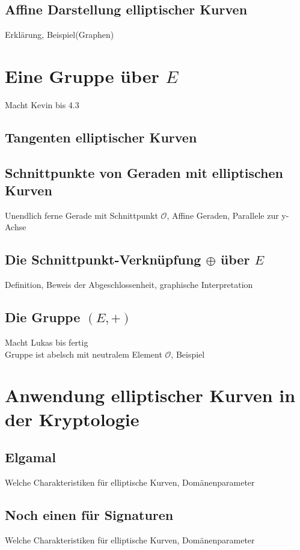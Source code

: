 \documentclass[hidelinks]{article}
\begin{document}
\subsection{Affine Darstellung elliptischer Kurven}
Erklärung, Beispiel(Graphen)
\section{Eine Gruppe über $E$}
Macht Kevin bis 4.3\\
\subsection{Tangenten elliptischer Kurven}
\subsection{Schnittpunkte von Geraden mit elliptischen Kurven}
Unendlich ferne Gerade mit Schnittpunkt $\mathcal{O}$, Affine Geraden, Parallele zur y-Achse
\subsection{Die Schnittpunkt-Verknüpfung $\oplus $ über $E$}
Definition, Beweis der Abgeschlossenheit, graphische Interpretation
\subsection{Die Gruppe $(E, +)$}
Macht Lukas bis fertig\\
Gruppe ist abelsch mit neutralem Element $\mathcal{O}$, Beispiel
\section{Anwendung elliptischer Kurven in der Kryptologie}
\subsection{Elgamal}
Welche Charakteristiken für elliptische Kurven, Domänenparameter
\subsection{Noch einen für Signaturen}
Welche Charakteristiken für elliptische Kurven, Domänenparameter

\nocite{*}


\end{document}

